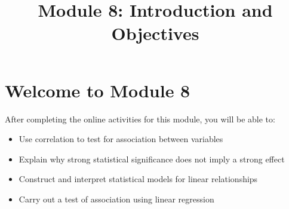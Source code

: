 \documentclass{article}
\title{Module 8: Introduction and Objectives}
\author{}
\date{}
\begin{document}
\maketitle

\section{Welcome to Module 8}

After completing the online activities for this module, you will be able to:

\begin{itemize}
    \item Use correlation to test for association between variables
    \item Explain why strong statistical significance does not imply a strong effect
    \item Construct and interpret statistical models for linear relationships
    \item Carry out a test of association using linear regression
\end{itemize}
\end{document}

